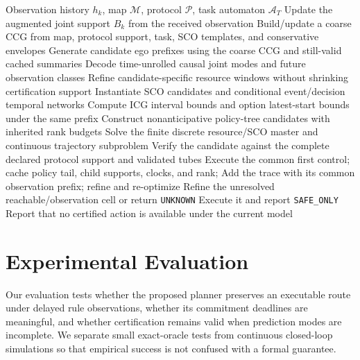 \documentclass[letterpaper]{article} %
\newcommand{\RAMP}{\textsc{RAMP}}
\begin{document}
\begin{algorithm}[t]
\footnotesize
\caption{\RAMP-D online safe-continuation planning}
\label{alg:planner}
\begin{algorithmic}[1]
\Require Observation history $h_k$, map $\mathcal M$, protocol $\mathcal P$, task automaton $\mathcal A_T$
\State Update the augmented joint support $B_k$ from the received observation
\State Build/update a coarse CCG from map, protocol support, task, SCO templates, and conservative envelopes
\State Generate candidate ego prefixes using the coarse CCG and still-valid cached summaries
  \State Decode time-unrolled causal joint modes and future observation classes
  \State Refine candidate-specific resource windows without shrinking certification support
  \State Instantiate SCO candidates and conditional event/decision temporal networks
  \State Compute ICG interval bounds and option latest-start bounds under the same prefix
  \State Construct nonanticipative policy-tree candidates with inherited rank budgets
\EndFor
\State Solve the finite discrete resource/SCO master and continuous trajectory subproblem
  \State Verify the candidate against the complete declared protocol support and validated tubes
    \State Execute the common first control; cache policy tail, child supports, clocks, and rank; \Return
    \State Add the trace with its common observation prefix; refine and re-optimize
  \Else
    \State Refine the unresolved reachable/observation cell or return \texttt{UNKNOWN}
  \EndIf
\EndWhile
{}
  \State Execute it and report \texttt{SAFE\_ONLY}
\Else
  \State Report that no certified action is available under the current model
\EndIf
\end{algorithmic}
\end{algorithm}

\section{Experimental Evaluation}
\label{sec:experiments}
Our evaluation tests whether the proposed planner preserves an executable route under delayed rule observations, whether its commitment deadlines are meaningful, and whether certification remains valid when prediction modes are incomplete. We separate small exact-oracle tests from continuous closed-loop simulations so that empirical success is not confused with a formal guarantee.
\end{document}
